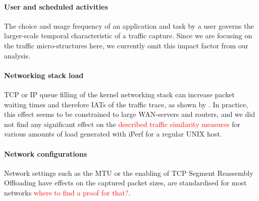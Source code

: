 \documentclass{article}
\begin{document}
\paragraph{User and scheduled activities}
The choice and usage frequency of an application and task by a user governs the larger-scale temporal characteristic of a traffic capture. Since we are focusing on the traffic micro-structures here, we currently omit this impact factor from our analysis. 

\paragraph{Networking stack load}
TCP or IP queue filling of the kernel networking stack can increase packet waiting times and therefore IATs of the traffic trace, as shown by \cite{sequeira2013influence}. In practice, this effect seems to be constrained to large WAN-servers and routers, and we did not find any significant effect on the \textcolor{red}{described traffic similarity measures} for various amounts of load generated with iPerf for a regular UNIX host.



\paragraph{Network configurations}
Network settings such as the MTU or the enabling of TCP Segment Reassembly Offloading have effects on the captured packet sizes, are standardised for most networks \textcolor{red}{where to find a proof for that?}.

\end{document}
